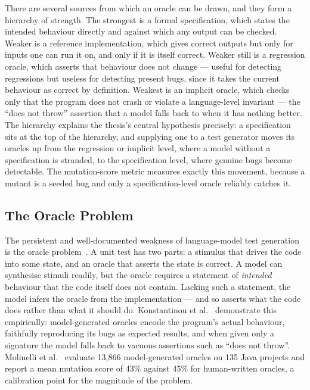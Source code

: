 There are several sources from which an oracle can be drawn, and they form a
hierarchy of strength. The strongest is a formal specification, which states the
intended behaviour directly and against which any output can be checked. Weaker is
a reference implementation, which gives correct outputs but only for inputs one can
run it on, and only if it is itself correct. Weaker still is a regression oracle,
which asserts that behaviour does not change --- useful for detecting regressions
but useless for detecting present bugs, since it takes the current behaviour as
correct by definition. Weakest is an implicit oracle, which checks only that the
program does not crash or violate a language-level invariant --- the
``does not throw'' assertion that a model falls back to when it has nothing better.
The hierarchy explains the thesis's central hypothesis precisely: a specification
sits at the top of the hierarchy, and supplying one to a test generator moves its
oracles up from the regression or implicit level, where a model without a
specification is stranded, to the specification level, where genuine bugs become
detectable. The mutation-score metric measures exactly this movement, because a
mutant is a seeded bug and only a specification-level oracle reliably catches it.

\subsection{The Oracle Problem}

The persistent and well-documented weakness of language-model test generation
is the oracle problem~\cite{schafer2023adaptive, jiang2024survey,
konstantinou2024oracles}. A unit test has two parts: a stimulus that drives
the code into some state, and an oracle that asserts the state is correct. A
model can synthesise stimuli readily, but the oracle requires a statement of
\emph{intended} behaviour that the code itself does not contain. Lacking such
a statement, the model infers the oracle from the implementation --- and so
asserts what the code does rather than what it should do. Konstantinou et
al.~\cite{konstantinou2024oracles} demonstrate this empirically: model-generated
oracles encode the program's actual behaviour, faithfully reproducing its bugs
as expected results, and when given only a signature the model falls back to
vacuous assertions such as ``does not throw''. Molinelli et
al.~\cite{molinelli2025oracles} evaluate 13{,}866 model-generated oracles on
135 Java projects and report a mean mutation score of 43\% against 45\% for
human-written oracles, a calibration point for the magnitude of the problem.


